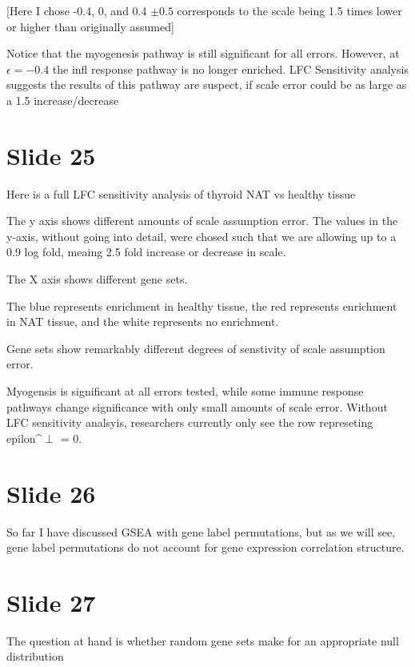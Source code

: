 \documentclass[11pt]{article}
\begin{document}
[Here I chose -0.4, 0, and 0.4 \(\pm0.5\) corresponds to the scale being 1.5 times lower or higher than originally assumed]

Notice that the myogenesis pathway is still significant for all errors. However, at \(\epsilon=-0.4\) the infl response pathway
is no longer enriched. LFC Sensitivity analysis suggests the results of this pathway are suspect, if scale error could
be as large as a 1.5 increase/decrease

\section{Slide 25}
\label{sec:orge7723e9}

Here is a full LFC sensitivity analysis of thyroid NAT vs healthy tissue

The y axis shows different amounts of scale assumption error.
The values in the y-axis, without going into detail, were chosed such that
we are allowing up to a 0.9 log fold, meaing 2.5 fold increase or decrease in scale.

The X axis shows different gene sets.

The blue represents enrichment in healthy tissue, the red represents enrichment in NAT tissue,
and the white represents no enrichment.

Gene sets show remarkably different degrees of senstivity of scale assumption error.

Myogensis is significant at all errors tested, while some immune response pathways change
significance with only small amounts of scale error. Without LFC sensitivity analsyis, researchers
currently only see the row represeting epilon\^{}\(\perp\) = 0.

\section{Slide 26}
\label{sec:org5b025db}

So far I have discussed GSEA with gene label permutations, but as we will see, gene label
permutations do not account for gene expression correlation structure.

\section{Slide 27}
\label{sec:org4e849c0}

The question at hand is whether random gene sets make for an appropriate null distribution
\end{document}
